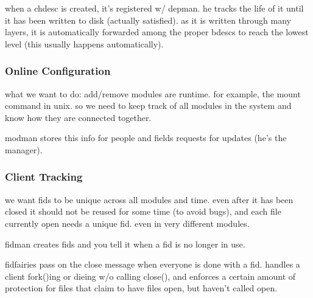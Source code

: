 when a chdesc is created, it's registered w/ depman. he tracks the
life of it until it has been written to disk (actually satisfied). as
it is written through many layers, it is automatically forwarded
among the proper bdescs to reach the lowest level (this usually
happens automatically).

\subsubsection{Online Configuration}

what we want to do: add/remove modules are runtime. for example, the
mount command in unix. so we need to keep track of all modules in the
system and know how they are connected together.

modman stores this info for people and fields requests for updates
(he's the manager).

\subsubsection{Client Tracking}

we want fids to be unique across all modules and time. even after it
has been closed it should not be reused for some time (to avoid bugs),
and each file currently open needs a unique fid. even in very
different modules.

fidman creates fids and you tell it when a fid is no longer in use.

fidfairies pass on the close message when everyone is done with a
fid. handles a client fork()ing or dieing w/o calling close(), and
enforces a certain amount of protection for files that claim to have
files open, but haven't called open.

